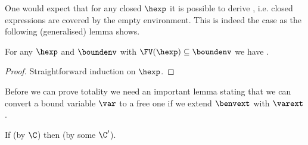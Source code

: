 One would expect that for any closed $\hexp$ it is possible to derive \cover{\emptyset}{\envnil}{\hexp}, i.e. closed expressions are covered by the empty environment.
This is indeed the case as the following (generalised) lemma shows.

\begin{lemma}
\label{lem:empty-cover}
For any $\hexp$ and $\boundenv$ with $\FV(\hexp) \subseteq \boundenv$ we have \cover{\boundenv}{\envnil}{\hexp}.
\end{lemma}


\begin{proof}
Straightforward induction on $\hexp$.
\end{proof}

Before we can prove totality we need an important lemma stating that we can convert a bound variable $\var$ to a free one if we extend $\benvext$ with $\varext$.

\begin{lemma}
\label{lem:bound-to-free}
If \cover{\boundenv \cup \set{\var}}{\benvext}{\hexp} (by $\C$) then \cover{\boundenv}{\benvext \envcons \varext}{\hexp} (by some $\C'$).
\end{lemma}


